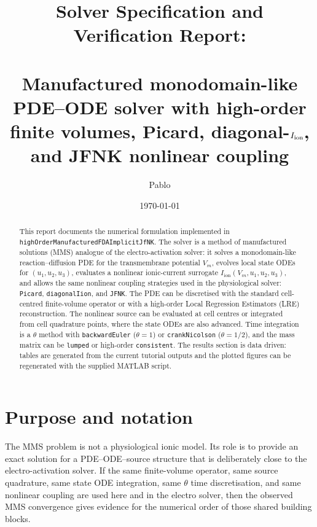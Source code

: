 \documentclass[11pt,a4paper]{article}
\title{Solver Specification and Verification Report:\\
       \texorpdfstring{\code{highOrderManufacturedFDAImplicitJfNK}}{highOrderManufacturedFDAImplicitJfNK}\\
       \large Manufactured monodomain-like PDE--ODE solver with high-order finite volumes,
       Picard, diagonal-\texorpdfstring{$\Iion$}{Iion}, and JFNK nonlinear coupling}
\author{Pablo}
\date{\today}
\newcommand{\code}[1]{\texttt{\small #1}}
\newcommand{\Vm}{V_m}
\newcommand{\Iion}{I_{\mathrm{ion}}}
\begin{document}
\maketitle

\begin{abstract}
This report documents the numerical formulation implemented in
\code{highOrderManufacturedFDAImplicitJfNK}. The solver is a method of
manufactured solutions (MMS) analogue of the electro-activation solver: it
solves a monodomain-like reaction--diffusion PDE for the transmembrane
potential $\Vm$, evolves local state ODEs for $(u_1,u_2,u_3)$, evaluates a
nonlinear ionic-current surrogate $\Iion(\Vm,u_1,u_2,u_3)$, and allows the same
nonlinear coupling strategies used in the physiological solver:
\code{Picard}, \code{diagonalIion}, and \code{JFNK}. The PDE can be discretised
with the standard cell-centred finite-volume operator or with a high-order
Local Regression Estimators (LRE) reconstruction. The nonlinear source can be
evaluated at cell centres or integrated from cell quadrature points, where the
state ODEs are also advanced. Time integration is a $\theta$ method with
\code{backwardEuler} ($\theta=1$) or \code{crankNicolson} ($\theta=1/2$), and
the mass matrix can be \code{lumped} or high-order \code{consistent}. The
results section is data driven: tables are generated from the current tutorial
outputs and the plotted figures can be regenerated with the supplied MATLAB
script.
\end{abstract}

\tableofcontents
\bigskip

\section{Purpose and notation}

The MMS problem is not a physiological ionic model. Its role is to provide an
exact solution for a PDE--ODE--source structure that is deliberately close to
the electro-activation solver. If the same finite-volume operator, same source
quadrature, same state ODE integration, same $\theta$ time discretisation, and
same nonlinear coupling are used here and in the electro solver, then the
observed MMS convergence gives evidence for the numerical order of those shared
building blocks.
\end{document}
